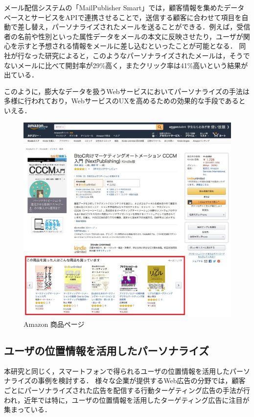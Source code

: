 \documentclass[a4paper]{jsarticle}
\begin{document}
メール配信システムの「MailPublisher Smart\cite{mail_publisher_smart}」では，顧客情報を集めたデータベースとサービスをAPIで連携させることで，送信する顧客に合わせて項目を自動で差し替え，パーソナライズされたメールを送ることができる．例えば，受信者の名前や性別といった属性データをメールの本文に反映させたり，ユーザが関心を示すと予想される情報をメールに差し込むといったことが可能となる．
同社が行なった研究によると，このようなパーソナライズされたメールは，そうでないメールに比べて開封率が29\%高く，またクリック率は41\%高いという結果が出ている\cite{mail_publisher_smart_study}．

このように，膨大なデータを扱うWebサービスにおいてパーソナライズの手法は多様に行われており，WebサービスのUXを高めるための効果的な手段であるといえる．

\fifigure
\begin{figure}[H]
  \begin{center}
    \includegraphics[width=0.8\hsize]{./images/research_amazon.jpg}
    \caption{Amazon 商品ページ}
    \label{fig:research-amazon}
  \end{center}
\end{figure}
\fi

\subsection{ユーザの位置情報を活用したパーソナライズ}
本研究と同じく，スマートフォンで得られるユーザの位置情報を活用したパーソナライズの事例を検討する．
様々な企業が提供するWeb広告の分野では，顧客ごとにパーソナライズされた広告を配信する行動ターゲティング広告の手法が行われ，近年では特に，ユーザの位置情報を活用したターゲティング広告に注目が集まっている．
\end{document}
